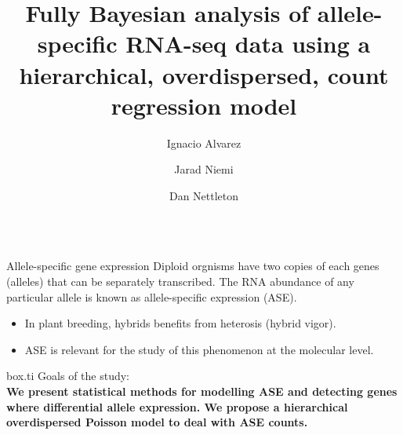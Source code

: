 \documentclass[final]{beamer}
\title{Fully Bayesian analysis of allele-specific RNA-seq data using a hierarchical, overdispersed, count regression model}
\author{Ignacio Alvarez \and Jarad Niemi \and Dan Nettleton}
\institute{Department of Statistics, Iowa State University}
\newlength{\onecolwid}
\newlength{\threecolwid}
\begin{document}
\begin{frame}
    \begin{columns}[t,totalwidth=\threecolwid]        
        \begin{column}{\onecolwid}

\begin{alertblock}{Allele-specific gene expression}
Diploid orgnisms have two copies of each genes (alleles) that can be separately transcribed. The RNA abundance of any particular allele is known as allele-specific expression (ASE). \\

\vspace{1cm}

\begin{itemize}
\item In plant breeding, hybrids benefits from heterosis (hybrid vigor).
\item ASE is relevant for the study of this phenomenon at the molecular level.
\end{itemize}
 

\vspace{1cm}

\begin{beamercolorbox}{box.ti}
\vspace{.1cm}
Goals of the study: \\
\textbf{We present statistical methods for modelling ASE and detecting genes where differential allele expression. We propose a hierarchical overdispersed Poisson model to deal with ASE counts. 
}
\vspace{.1cm}
\end{beamercolorbox}
\vspace{.1cm}
\end{alertblock}
\vspace{1cm}


\end{column}
\end{columns}
\end{frame}
\end{document}
